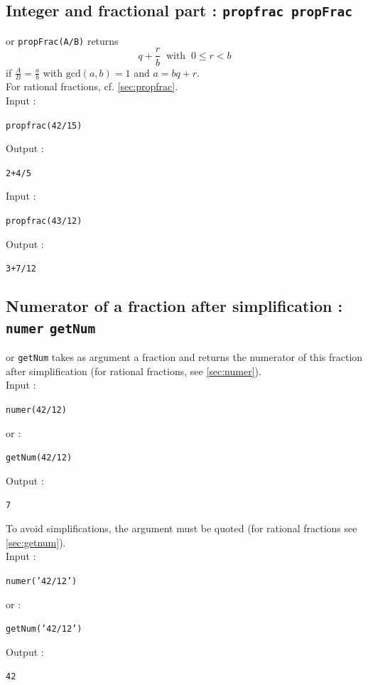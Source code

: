 \documentclass[a4paper,11pt]{book}
\begin{document}
\subsection{Integer and fractional part : {\tt propfrac propFrac}}\label{sec:ipropfrac}
 or {\tt propFrac(A/B)} returns 
$$q+\frac{r}{b}\ \mbox{ with } \ 0\leq r<b$$ 
if  $\displaystyle \frac{A}{B}=\frac{a}{b}$ with $\mbox{gcd}(a,b)=1$
and $a=bq+r$.\\
For rational fractions, cf. \ref{sec:propfrac}.\\
Input :
\begin{center}{\tt propfrac(42/15)}\end{center}
Output :
\begin{center}{\tt 2+4/5}\end{center}
Input :
\begin{center}{\tt  propfrac(43/12)}\end{center}
Output :
\begin{center}{\tt  3+7/12}\end{center}

\subsection{Numerator of a fraction after simplification : {\tt numer}
{\tt getNum}}\label{sec:inumer}
 or {\tt getNum} takes as argument a fraction and returns 
the numerator of this fraction  after simplification (for rational fractions,
see \ref{sec:numer}).\\
Input :
\begin{center}{\tt  numer(42/12)}\end{center}
or :
\begin{center}{\tt getNum(42/12)}\end{center}
Output :
\begin{center}{\tt 7}\end{center}
To avoid simplifications, the argument must
be quoted (for rational fractions see \ref{sec:getnum}).\\
Input :
\begin{center}{\tt  numer('42/12')}\end{center}
or :
\begin{center}{\tt  getNum('42/12')}\end{center}
Output :
\begin{center}{\tt 42}\end{center}
\end{document}
